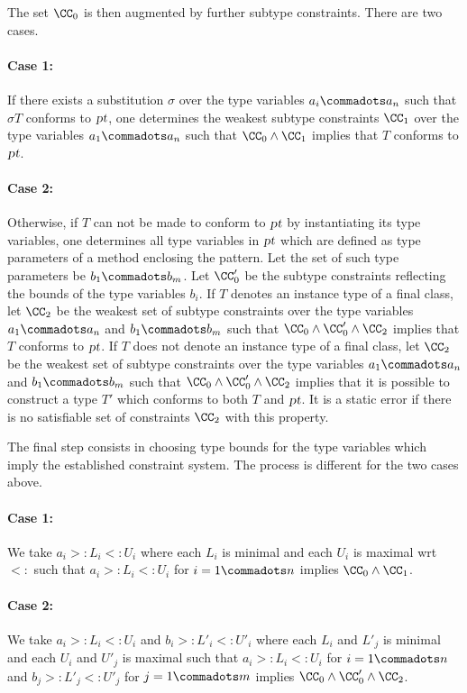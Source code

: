 The set $\CC_0$ is then augmented by further subtype constraints. There are two
cases.

\paragraph{Case 1:}
If there exists a substitution $\sigma$ over the type variables $a_i
\commadots a_n$ such that $\sigma T$ conforms to $\mbox{\sl pt}$, one determines
the weakest subtype constraints $\CC_1$ over the type variables $a_1
\commadots a_n$ such that $\CC_0 \wedge \CC_1$ implies that $T$
conforms to $\mbox{\sl pt}$.

\paragraph{Case 2:}
Otherwise, if $T$ can not be made to conform to $\mbox{\sl pt}$ by
instantiating its type variables, one determines all type variables in
$\mbox{\sl pt}$ which are defined as type parameters of a method enclosing
the pattern. Let the set of such type parameters be $b_1 \commadots
b_m$. Let $\CC'_0$ be the subtype constraints reflecting the bounds of the
type variables $b_i$.  If $T$ denotes an instance type of a final
class, let $\CC_2$ be the weakest set of subtype constraints over the type
variables $a_1 \commadots a_n$ and $b_1 \commadots b_m$ such that
$\CC_0 \wedge \CC'_0 \wedge \CC_2$ implies that $T$ conforms to
$\mbox{\sl pt}$.  If $T$ does not denote an instance type of a final class,
let $\CC_2$ be the weakest set of subtype constraints over the type variables
$a_1 \commadots a_n$ and $b_1 \commadots b_m$ such that $\CC_0 \wedge
\CC'_0 \wedge \CC_2$ implies that it is possible to construct a type
$T'$ which conforms to both $T$ and $\mbox{\sl pt}$. It is a static error if
there is no satisfiable set of constraints $\CC_2$ with this property.

The final step consists in choosing type bounds for the type
variables which imply the established constraint system. The process
is different for the two cases above.

\paragraph{Case 1:}
We take $a_i >: L_i <: U_i$ where each
$L_i$ is minimal and each $U_i$ is maximal wrt $<:$ such that
$a_i >: L_i <: U_i$ for $i = 1 \commadots n$ implies $\CC_0 \wedge \CC_1$.

\paragraph{Case 2:}
We take $a_i >: L_i <: U_i$ and $b_i >: L'_i <: U'_i$ where each $L_i$
and $L'_j$ is minimal and each $U_i$ and $U'_j$ is maximal such that
$a_i >: L_i <: U_i$ for $i = 1 \commadots n$ and 
$b_j >: L'_j <: U'_j$ for $j = 1 \commadots m$
implies $\CC_0 \wedge \CC'_0 \wedge \CC_2$.

